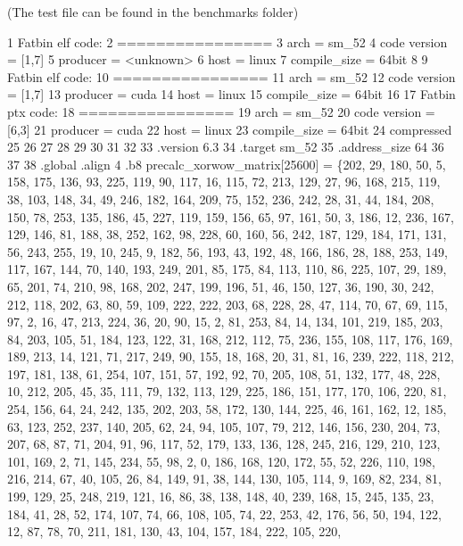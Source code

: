 (The test file can be found in the benchmarks folder) 
\begin{DoxyCode}
1 Fatbin elf code:
2 ================
3 arch = sm\_52
4 code version = [1,7]
5 producer = <unknown>
6 host = linux
7 compile\_size = 64bit
8 
9 Fatbin elf code:
10 ================
11 arch = sm\_52
12 code version = [1,7]
13 producer = cuda
14 host = linux
15 compile\_size = 64bit
16 
17 Fatbin ptx code:
18 ================
19 arch = sm\_52
20 code version = [6,3]
21 producer = cuda
22 host = linux
23 compile\_size = 64bit
24 compressed
25 
26 
27 
28 
29 
30 
31 
32 
33 .version 6.3
34 .target sm\_52
35 .address\_size 64
36 
37 
38 .global .align 4 .b8 precalc\_xorwow\_matrix[25600] = \{202, 29, 180, 50, 5, 158, 175, 136, 93, 225, 119, 90,
       117, 16, 115, 72, 213, 129, 27, 96, 168, 215, 119, 38, 103, 148, 34, 49, 246, 182, 164, 209, 75, 152, 236,
       242, 28, 31, 44, 184, 208, 150, 78, 253, 135, 186, 45, 227, 119, 159, 156, 65, 97, 161, 50, 3, 186, 12, 236,
       167, 129, 146, 81, 188, 38, 252, 162, 98, 228, 60, 160, 56, 242, 187, 129, 184, 171, 131, 56, 243, 255, 19,
       10, 245, 9, 182, 56, 193, 43, 192, 48, 166, 186, 28, 188, 253, 149, 117, 167, 144, 70, 140, 193, 249, 201,
       85, 175, 84, 113, 110, 86, 225, 107, 29, 189, 65, 201, 74, 210, 98, 168, 202, 247, 199, 196, 51, 46, 150,
       127, 36, 190, 30, 242, 212, 118, 202, 63, 80, 59, 109, 222, 222, 203, 68, 228, 28, 47, 114, 70, 67, 69, 115,
       97, 2, 16, 47, 213, 224, 36, 20, 90, 15, 2, 81, 253, 84, 14, 134, 101, 219, 185, 203, 84, 203, 105, 51, 184,
       123, 122, 31, 168, 212, 112, 75, 236, 155, 108, 117, 176, 169, 189, 213, 14, 121, 71, 217, 249, 90, 155, 18,
       168, 20, 31, 81, 16, 239, 222, 118, 212, 197, 181, 138, 61, 254, 107, 151, 57, 192, 92, 70, 205, 108, 51,
       132, 177, 48, 228, 10, 212, 205, 45, 35, 111, 79, 132, 113, 129, 225, 186, 151, 177, 170, 106, 220, 81, 254,
       156, 64, 24, 242, 135, 202, 203, 58, 172, 130, 144, 225, 46, 161, 162, 12, 185, 63, 123, 252, 237, 140, 205,
       62, 24, 94, 105, 107, 79, 212, 146, 156, 230, 204, 73, 207, 68, 87, 71, 204, 91, 96, 117, 52, 179, 133, 136,
       128, 245, 216, 129, 210, 123, 101, 169, 2, 71, 145, 234, 55, 98, 2, 0, 186, 168, 120, 172, 55, 52, 226,
       110, 198, 216, 214, 67, 40, 105, 26, 84, 149, 91, 38, 144, 130, 105, 114, 9, 169, 82, 234, 81, 199, 129, 25,
       248, 219, 121, 16, 86, 38, 138, 148, 40, 239, 168, 15, 245, 135, 23, 184, 41, 28, 52, 174, 107, 74, 66, 108,
       105, 74, 22, 253, 42, 176, 56, 50, 194, 122, 12, 87, 78, 70, 211, 181, 130, 43, 104, 157, 184, 222, 105, 220,

\end{DoxyCode}
